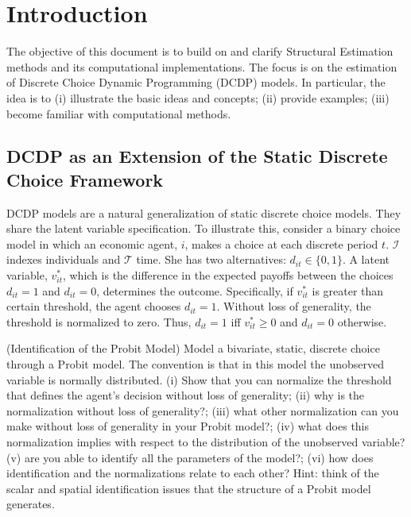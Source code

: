 \section{Introduction} \label{section:intro}
\noindent The objective of this document is to build on \citet{keane2011structural} and clarify Structural Estimation methods and its computational implementations. The focus is on the estimation of Discrete Choice Dynamic Programming (DCDP) models. In particular, the idea is to (i) illustrate the basic ideas and concepts; (ii) provide examples; (iii) become familiar with computational methods.\\

\subsection{DCDP as an Extension of the Static Discrete Choice Framework} \label{section:extension}
DCDP models are a natural generalization of static discrete choice models. They share the latent variable specification. To illustrate this, consider a binary choice model in which an economic agent, $i$, makes a choice at each discrete period $t$. $\mathcal{I}$ indexes individuals and $\mathcal{T}$ time. She has two alternatives: $d_{it} \in \{ 0,1\}$. A latent variable, $v_{it}^*$, which is the difference in the expected payoffs between the choices $d_{it} = 1$ and $d_{it} = 0$, determines the outcome. Specifically, if $v_{it}^*$ is greater than certain threshold, the agent chooses $d_{it} = 1$. Without loss of generality, the threshold is normalized to zero. Thus, $d_{it} = 1$ iff $v_{it}^* \geq 0$ and $d_{it} = 0$ otherwise.\\
\begin{exercise} (Identification of the Probit Model) \label{exercise:idenprobit}
Model a bivariate, static, discrete choice through a Probit model. The convention is that in this model the unobserved variable is normally distributed. (i) Show that you can normalize the threshold that defines the agent's decision without loss of generality;  (ii) why is the normalization without loss of generality?; (iii) what other normalization can you make without loss of generality in your Probit model?; (iv) what does this normalization implies with respect to the distribution of the unobserved variable? (v) are you able to identify all the parameters of the model?; (vi) how does identification and the normalizations relate to each other? Hint: think of the scalar and spatial identification issues that the structure of a Probit model generates.
\end{exercise}

